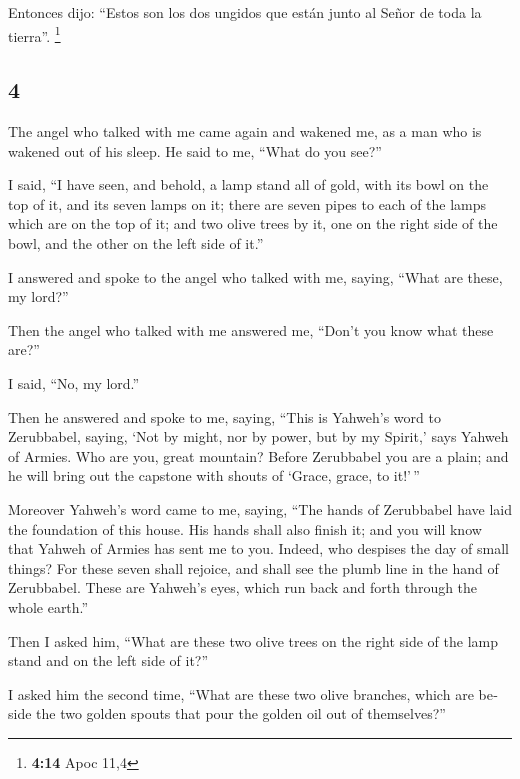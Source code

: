 \begin{paracol}{2}
 Entonces dijo: ``Estos son los dos ungidos que están
junto al Señor de toda la tierra''. \footnote{\textbf{4:14} Apoc 11,4}

\switchcolumn
\begin{otherlanguage}{english}

\hypertarget{section-7}{%
\section{4}\label{section-7}}

 The angel who talked with me came again and wakened me,
as a man who is wakened out of his sleep.  He said to me,
``What do you see?''

I said, ``I have seen, and behold, a lamp stand all of gold, with its
bowl on the top of it, and its seven lamps on it; there are seven pipes
to each of the lamps which are on the top of it;  and two
olive trees by it, one on the right side of the bowl, and the other on
the left side of it.''

 I answered and spoke to the angel who talked with me,
saying, ``What are these, my lord?''

 Then the angel who talked with me answered me, ``Don't
you know what these are?''

I said, ``No, my lord.''

 Then he answered and spoke to me, saying, ``This is
Yahweh's word to Zerubbabel, saying, `Not by might, nor by power, but by
my Spirit,' says Yahweh of Armies.  Who are you, great
mountain? Before Zerubbabel you are a plain; and he will bring out the
capstone with shouts of `Grace, grace, to it!'\,''

 Moreover Yahweh's word came to me, saying, 
``The hands of Zerubbabel have laid the foundation of this house. His
hands shall also finish it; and you will know that Yahweh of Armies has
sent me to you.  Indeed, who despises the day of small
things? For these seven shall rejoice, and shall see the plumb line in
the hand of Zerubbabel. These are Yahweh's eyes, which run back and
forth through the whole earth.''

 Then I asked him, ``What are these two olive trees on
the right side of the lamp stand and on the left side of it?''

 I asked him the second time, ``What are these two olive
branches, which are beside the two golden spouts that pour the golden
oil out of themselves?''


\end{otherlanguage}
\end{paracol}
